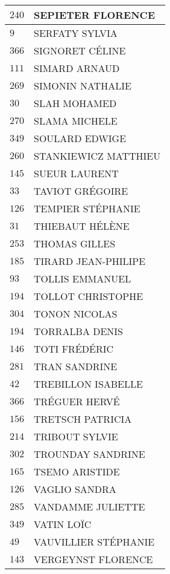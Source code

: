 \begin{xltabular}{\linewidth}{|l|X|}
    $240$ & SEPIETER FLORENCE \\
    \hline
    $9$ & SERFATY SYLVIA \\
    \hline
    $366$ & SIGNORET CÉLINE \\
    \hline
    $111$ & SIMARD ARNAUD \\
    \hline
    $269$ & SIMONIN NATHALIE \\
    \hline
    $30$ & SLAH MOHAMED \\
    \hline
    $270$ & SLAMA MICHELE \\
    \hline
    $349$ & SOULARD EDWIGE \\
    \hline
    $260$ & STANKIEWICZ MATTHIEU \\
    \hline
    $145$ & SUEUR LAURENT \\
    \hline
    $33$ & TAVIOT GRÉGOIRE \\
    \hline
    $126$ & TEMPIER STÉPHANIE \\
    \hline
    $31$ & THIEBAUT HÉLÈNE \\
    \hline
    $253$ & THOMAS GILLES \\
    \hline
    $185$ & TIRARD JEAN-PHILIPE \\
    \hline
    $93$ & TOLLIS EMMANUEL \\
    \hline
    $194$ & TOLLOT CHRISTOPHE \\
    \hline
    $304$ & TONON NICOLAS \\
    \hline
    $194$ & TORRALBA DENIS \\
    \hline
    $146$ & TOTI FRÉDÉRIC \\
    \hline
    $281$ & TRAN SANDRINE \\
    \hline
    $42$ & TREBILLON ISABELLE \\
    \hline
    $366$ & TRÉGUER HERVÉ \\
    \hline
    $156$ & TRETSCH PATRICIA \\
    \hline
    $214$ & TRIBOUT SYLVIE \\
    \hline
    $302$ & TROUNDAY SANDRINE \\
    \hline
    $165$ & TSEMO ARISTIDE \\
    \hline
    $126$ & VAGLIO SANDRA \\
    \hline
    $285$ & VANDAMME JULIETTE \\
    \hline
    $349$ & VATIN LOÏC \\
    \hline
    $49$ & VAUVILLIER STÉPHANIE \\
    \hline
    $143$ & VERGEYNST FLORENCE \\

\end{xltabular}
